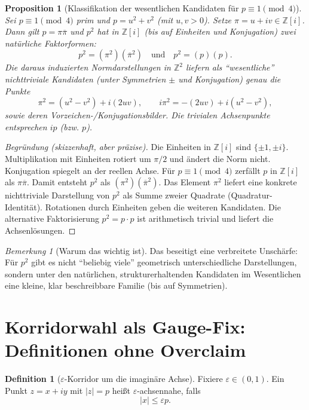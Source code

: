 \documentclass[a4paper,11pt]{article}
\newtheorem{proposition}[satz]{Proposition}
\theoremstyle{definition}
\newtheorem{definition}[satz]{Definition}
\theoremstyle{remark}
\newtheorem{bemerkung}[satz]{Bemerkung}
\newcommand{\Z}{\mathbb{Z}}
\newcommand{\Zi}{\mathbb{Z}[i]}
\newcommand{\abs}[1]{\left|#1\right|}
\newcommand{\unit}{\{\pm 1,\pm i\}}
\begin{document}
	\begin{proposition}[Klassifikation der wesentlichen Kandidaten für \(p\equiv 1\pmod4\)]
		\label{prop:candidates}
		Sei \(p\equiv 1\pmod4\) prim und \(p=u^2+v^2\) (mit \(u,v>0\)). Setze \(\pi=u+iv\in\Zi\).
		Dann gilt \(p=\pi\overline{\pi}\) und \(p^2\) hat in \(\Zi\) (bis auf Einheiten und Konjugation) zwei natürliche
		Faktorformen:
		\[
		p^2=(\pi^2)(\overline{\pi}^2)\quad\text{und}\quad p^2=(p)(p).
		\]
		Die daraus induzierten Normdarstellungen in \(\Z^2\) liefern als ``wesentliche'' nichttriviale Kandidaten
		(unter Symmetrien \(\pm\) und Konjugation) genau die Punkte
		\[
		\pi^2=(u^2-v^2)+i(2uv),\qquad i\pi^2=-(2uv)+i(u^2-v^2),
		\]
		sowie deren Vorzeichen-/Konjugationsbilder. Die trivialen Achsenpunkte entsprechen \(ip\) (bzw. \(p\)).
	\end{proposition}
	
	\begin{proof}[Begründung (skizzenhaft, aber präzise)]
		Die Einheiten in \(\Zi\) sind \(\unit\). Multiplikation mit Einheiten rotiert um \(\pi/2\) und ändert die Norm nicht.
		Konjugation spiegelt an der reellen Achse. Für \(p\equiv 1\pmod4\) zerfällt \(p\) in \(\Zi\) als \(\pi\overline{\pi}\).
		Damit entsteht \(p^2\) als \((\pi^2)(\overline{\pi}^2)\). Das Element \(\pi^2\) liefert eine konkrete nichttriviale
		Darstellung von \(p^2\) als Summe zweier Quadrate (Quadratur-Identität). Rotationen durch Einheiten geben die
		weiteren Kandidaten. Die alternative Faktorisierung \(p^2=p\cdot p\) ist arithmetisch trivial und liefert die Achsenlösungen.
	\end{proof}
	
	\begin{bemerkung}[Warum das wichtig ist]
		Das beseitigt eine verbreitete Unschärfe: Für \(p^2\) gibt es nicht ``beliebig viele'' geometrisch unterschiedliche
		Darstellungen, sondern unter den natürlichen, strukturerhaltenden Kandidaten im Wesentlichen eine kleine, klar
		beschreibbare Familie (bis auf Symmetrien).
	\end{bemerkung}
	
	\section{Korridorwahl als Gauge-Fix: Definitionen ohne Overclaim}
	\begin{definition}[\(\varepsilon\)-Korridor um die imaginäre Achse]
		Fixiere \(\varepsilon\in(0,1)\). Ein Punkt \(z=x+iy\) mit \(|z|=p\) heißt \(\varepsilon\)-achsennahe, falls
		\[
		\abs{x}\le \varepsilon p.
		\]
	\end{definition}
	
\end{document}
